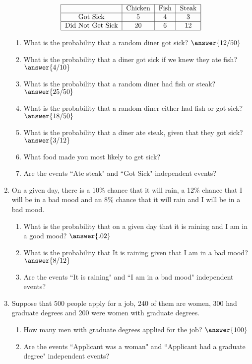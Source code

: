 \documentclass{ximera}
\begin{document}
\begin{enumerate}
$$\begin{tabular}{|c|c|c|c|}
\hline
 & Chicken & Fish & Steak \\
\hline
Got Sick & 5 & 4 & 3\\
\hline
Did Not Get Sick & 20 & 6 & 12\\
\hline
\end{tabular}$$
\begin{enumerate}
\item What is the probability that a random diner got sick? $\answer{12/50}$
\item What is the probability that a diner got sick if we knew they ate fish? $\answer{4/10}$
\item What is the probability that a random diner had fish or steak? $\answer{25/50}$
\item What is the probability that a random diner either had fish or got sick? $\answer{18/50}$
\item What is the probability that a diner ate steak, given that they got sick? $\answer{3/12}$
\item What food made you most likely to get sick? 

\begin{multipleChoice}
\end{multipleChoice}


\item Are the events ``Ate steak" and ``Got Sick" independent events?
\end{enumerate}
\item On a given day, there is a 10\% chance that it will rain, a 12\% chance that I will be in a bad mood and an 8\% chance that it will rain and I will be in a bad mood.
\begin{enumerate}
\item What is the probability that on a given day that it is raining and I am in a good mood? $\answer{.02}$
\item What is the probability that It is raining given that I am in a bad mood? $\answer{8/12}$
\item Are the events ``It is raining" and ``I am in a bad mood" independent events? 
\begin{multipleChoice}
\end{multipleChoice}

\end{enumerate}
\item Suppose that 500 people apply for a job, 240 of them are women, 300 had graduate degrees and 200 were women with graduate degrees.
\begin{enumerate}
\item How many men with graduate degrees applied for the job? $\answer{100}$
\item Are the events ``Applicant was a woman" and ``Applicant had a graduate degree" independent events?
\begin{multipleChoice}
\end{multipleChoice}


\end{enumerate}
\end{enumerate}
\end{document}
